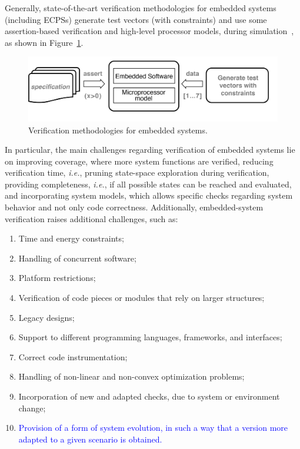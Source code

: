 \documentclass{cta-author}
\begin{document}
Generally, state-of-the-art verification methodologies for embedded systems (including ECPSs) generate test vectors (with constraints) and use some assertion-based verification and high-level processor models, during simulation~\cite{Behrend15,Lettnin09}, as shown in Figure~\ref{verification-methodologies}. 
%
\begin{figure}[h]
	\centering
	\includegraphics[width=\columnwidth]{figure4.jpg}
	\caption{Verification methodologies for embedded systems.}
	\label{verification-methodologies}
\end{figure}


In particular, the main challenges regarding verification of embedded systems lie on improving coverage, where more system functions are verified, reducing verification time, {\it i.e.}, pruning state-space exploration during verification, providing completeness, {\it i.e.},  if all possible states can be reached and evaluated, and incorporating system models, which allows specific checks regarding system behavior and not only code correctness. Additionally, embedded-system verification raises additional challenges, such as:
%
\begin{enumerate}
	\item Time and energy constraints;
	\item Handling of concurrent software;
	\item Platform restrictions;
	\item Verification of code pieces or modules that rely on larger structures;
	\item Legacy designs; %
	\item Support to different programming languages, frameworks, and interfaces;
	\item Correct code instrumentation;
	\item Handling of non-linear and non-convex optimization problems;
	\item Incorporation of new and adapted checks, due to system or environment change;
	\item \textcolor{blue}{Provision of a form of system evolution, in such a way that a version more adapted to a given scenario is obtained.}
\end{enumerate}
\end{document}

